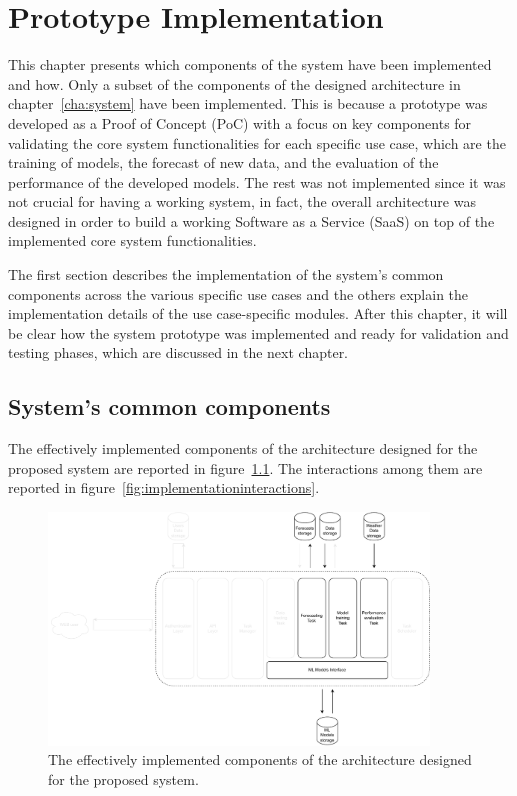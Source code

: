 \chapter{Prototype Implementation}
\label{cha:implementation}
\vspace{0.4 cm}

This chapter presents which components of the system have been implemented and how.
Only a subset of the components of the designed architecture in chapter~\ref{cha:system} have been implemented.
This is because a prototype was developed as a Proof of Concept (PoC) with a focus on key components for validating the core system functionalities for each specific use case, which are the training of models, the forecast of new data, and the evaluation of the performance of the developed models.
The rest was not implemented since it was not crucial for having a working system, in fact, the overall architecture was designed in order to build a working Software as a Service (SaaS) on top of the implemented core system functionalities.

The first section describes the implementation of the system's common components across the various specific use cases and the others explain the implementation details of the use case-specific modules.
After this chapter, it will be clear how the system prototype was implemented and ready for validation and testing phases, which are discussed in the next chapter.


\section{System's common components}
\label{sec:componentsimpl}
\vspace{0.2 cm}

The effectively implemented components of the architecture designed for the proposed system are reported in figure~\ref{fig:implementationcomponents}.
The interactions among them are reported in figure~\ref{fig:implementationinteractions}.

\begin{figure}[H]
\centering
\includegraphics[width=0.9\textwidth]{images/implementation_components}
\caption{The effectively implemented components of the architecture designed for the proposed system.}
\label{fig:implementationcomponents}
\end{figure}


